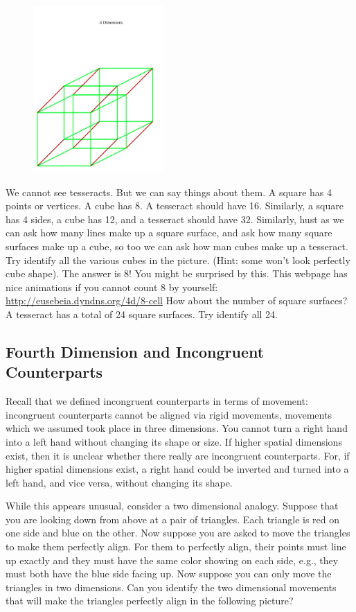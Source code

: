 \documentclass[oneside]{article}
\begin{document}
\begin{figure}[h!]
\centering
\includegraphics[width=50mm]{four.jpg}
\end{figure}

We cannot see tesseracts. But we can say things about them. A square has 4 points or vertices. A cube has 8. A tesseract should have 16. Similarly, a square has 4 sides, a cube has 12, and a tesseract should have 32.  Similarly, hust as we can ask how many lines make up a square surface, and ask how many square surfaces make up a cube, so too we can ask how man cubes make up a tesseract. Try identify all the various cubes in the picture. (Hint: some won't look perfectly cube shape). The answer is 8! You might be surprised by this. This webpage has nice animations if you cannot count 8 by yourself: \url{http://eusebeia.dyndns.org/4d/8-cell} How about the number of square surfaces? A tesseract has a total of 24 square surfaces. Try identify all 24.



\subsection*{Fourth Dimension and Incongruent Counterparts}

Recall that we defined incongruent counterparts in terms of movement: incongruent counterparts cannot be aligned via rigid movements, movements which we assumed took place in three dimensions. You cannot turn a right hand into a left hand without changing its shape or size. If higher spatial dimensions exist, then it is unclear whether there really are incongruent counterparts. For, if higher spatial dimensions exist, a right hand could be inverted and turned into a left hand, and vice versa, without changing its shape.

While this appears unusual, consider a two dimensional analogy. Suppose that you are looking down from above at a pair of triangles. Each triangle is red on one side and blue on the other. Now suppose you are asked to move the triangles to make them perfectly align. For them to perfectly align, their points must line up exactly and they must have the same color showing on each side, e.g., they must both have the blue side facing up. Now suppose you can only move the triangles in two dimensions. Can you identify the two dimensional movements that will make the triangles perfectly align in the following picture? 
\end{document}
